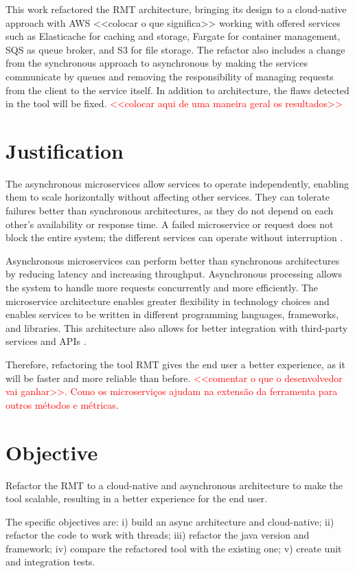 This work refactored the RMT architecture, bringing its design to a cloud-native approach with AWS <<colocar o que significa>> working with offered services such as Elasticache for caching and storage, Fargate for container management, SQS as queue broker, and S3 for file storage. The refactor also includes a change from the synchronous approach to asynchronous by making the services communicate by queues and removing the responsibility of managing requests from the client to the service itself. In addition to architecture, the flaws detected in the tool will be fixed.
\textcolor{red}{<<colocar aqui de uma maneira geral os resultados>>}

\section{Justification}
The asynchronous microservices allow services to operate independently, enabling them to scale horizontally without affecting other services. They can tolerate failures better than synchronous architectures, as they do not depend on each other's availability or response time. A failed microservice or request does not block the entire system; the different services can operate without interruption \cite{microservices-comuni}.

Asynchronous microservices can perform better than synchronous architectures by reducing latency and increasing throughput. Asynchronous processing allows the system to handle more requests concurrently and more efficiently. The microservice architecture enables greater flexibility in technology choices and enables services to be written in different programming languages, frameworks, and libraries. This architecture also allows for better integration with third-party services and APIs \cite{larrucea2018}.

Therefore, refactoring the tool RMT gives the end user a better experience, as it will be faster and more reliable than before. \textcolor{red}{<<comentar o que o desenvolvedor vai ganhar>>. Como os microserviços ajudam na extensão da ferramenta para outros métodos e métricas}.

\section{Objective}
Refactor the RMT to a cloud-native and asynchronous architecture to make the tool scalable, resulting in a better experience for the end user.

The specific objectives are: i) build an async architecture and cloud-native; ii) refactor the code to work with threads; iii) refactor the java version and framework; iv) compare the refactored tool with the existing one; v) create unit and integration tests.

